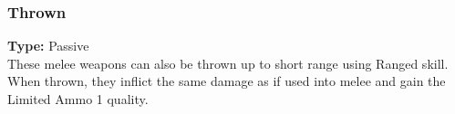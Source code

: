 \subsubsection{Thrown}
\label{iqty:thrown}
\textbf{Type:} Passive\\
These melee weapons can also be thrown up to
short range using Ranged skill. When thrown, they
inflict the same damage as if used into melee and gain
the Limited Ammo 1 quality.
